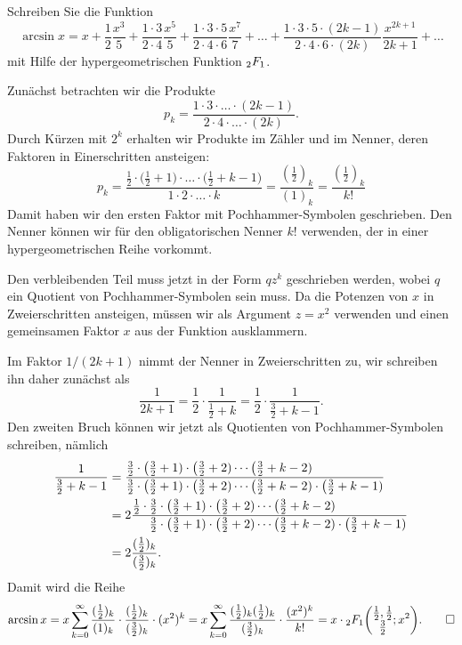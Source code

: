 Schreiben Sie die Funktion
\[
\arcsin x
=
x
+
\frac{1}{2} \frac{x^3}{5}
+
\frac{1\cdot 3}{2\cdot 4}\frac{x^5}{5}
+
\frac{1\cdot 3\cdot 5}{2\cdot 4\cdot 6}\frac{x^7}{7}
+
\dots
+
\frac{1\cdot 3\cdot 5\cdot (2k-1)}{2\cdot4\cdot 6\cdot (2k)}
\frac{x^{2k+1}}{2k+1}
+
\dots
\]
mit Hilfe der hypergeometrischen Funktion $\mathstrut_2F_1$.

\begin{loesung}
Zunächst betrachten wir die Produkte
\[
p_k
=
\frac{1\cdot 3\cdot \ldots \cdot (2k-1)}{2\cdot 4\cdot\ldots\cdot (2k)}.
\]
Durch Kürzen mit $2^k$ erhalten wir Produkte im Zähler und im Nenner, deren
Faktoren in Einerschritten ansteigen:
\[
p_k
=
\frac{
\frac12\cdot
\bigl(
\frac12+1\bigr)\cdot\ldots\cdot\bigl(\frac12+k-1\bigr)
}{
1\cdot 2\cdot \ldots \cdot k
}
=
\frac{(\frac12)_k}{(1)_k}
=
\frac{(\frac12)_k}{k!}
\]
Damit haben wir den ersten Faktor mit Pochhammer-Symbolen geschrieben.
Den Nenner können wir für den obligatorischen Nenner $k!$ verwenden,
der in einer hypergeometrischen Reihe vorkommt.

Den verbleibenden Teil muss jetzt in der Form $qz^k$ geschrieben werden,
wobei $q$ ein Quotient von Pochhammer-Symbolen sein muss.
Da die Potenzen von $x$ in Zweierschritten ansteigen, müssen wir als
Argument $z=x^2$ verwenden und einen gemeinsamen Faktor $x$ aus der
Funktion ausklammern.

Im Faktor $1/(2k+1)$ nimmt der Nenner in Zweierschritten zu, wir schreiben
ihn daher zunächst als
\[
\frac{1}{2k+1}
=
\frac{1}{2}\cdot \frac{1}{\frac12+k}
=
\frac{1}{2}\cdot\frac{1}{\frac32+k-1}.
\]
Den zweiten Bruch können wir jetzt als Quotienten von Pochhammer-Symbolen
schreiben, nämlich
\begin{align*}
\frac{1}{\frac32+k-1}
&=
\frac{
\frac32
\cdot
\bigl(\frac32+1)
\cdot
\bigl(\frac32+2)
\cdots
\bigl(\frac32+k-2)
\phantom{
\mathstrut
\cdot
\bigl(\frac32+k-1)
}
}{
\frac32
\cdot
\bigl(\frac32+1)
\cdot
\bigl(\frac32+2)
\cdots
\bigl(\frac32+k-2)
\cdot
\bigl(\frac32+k-1)
}
\\
&=
2
\frac{
\frac12
\cdot
\frac32
\cdot
\bigl(\frac32+1)
\cdot
\bigl(\frac32+2)
\cdots
\bigl(\frac32+k-2)
\phantom{
\mathstrut
\cdot
\bigl(\frac32+k-1)
}
}{
\phantom{
\frac12
\cdot
\mathstrut
}
\frac32
\cdot
\bigl(\frac32+1)
\cdot
\bigl(\frac32+2)
\cdots
\bigl(\frac32+k-2)
\cdot
\bigl(\frac32+k-1)
}
\\
&=
2\frac{(\frac12)_k}{(\frac32)_k}.
\end{align*}
Damit wird die Reihe
\[
\arcsin x
=
x
\sum_{k=0}^\infty
\frac{(\frac12)_k}{(1)_k}
\cdot
\frac{(\frac12)_k}{(\frac32)_k}
\cdot
(x^2)^k
=
x
\sum_{k=0}^\infty
\frac{(\frac12)_k(\frac12)_k}{(\frac32)_k}
\cdot
\frac{(x^2)^k}{k!}
=
x\cdot
\mathstrut_2F_1\biggl(
\begin{matrix}
\frac12,\frac12\\ \frac32
\end{matrix}
;x^2
\biggr).
\qedhere
\]
\end{loesung}
